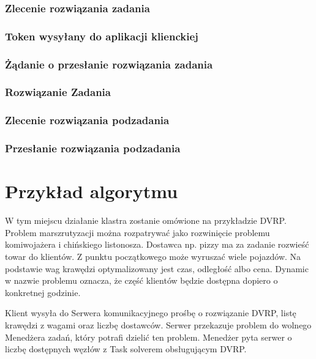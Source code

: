 \documentclass[12pt,a4paper,titlepage]{report}
\begin{document}
		\subsection{Zlecenie rozwiązania zadania}
			
		\subsection{Token wysyłany do aplikacji klienckiej}
			
		\subsection{Żądanie o przesłanie rozwiązania zadania}
			
		\subsection{Rozwiązanie Zadania}
			
		\subsection{Zlecenie rozwiązania podzadania}
			
		\subsection{Przesłanie rozwiązania podzadania}
			
			
\chapter{Przykład algorytmu}
		W tym miejscu działanie klastra zostanie omówione na przykładzie DVRP. Problem marszrutyzacji można rozpatrywać jako rozwinięcie problemu komiwojażera i chińskiego listonosza. Dostawca np. pizzy ma za zadanie rozwieść towar do klientów. Z punktu początkowego może wyruszać wiele pojazdów. Na podstawie wag krawędzi optymalizowany jest czas, odległość albo cena. Dynamic w nazwie problemu oznacza, że część klientów będzie dostępna dopiero o konkretnej godzinie.
		
		Klient wysyła do Serwera komunikacyjnego prośbę o rozwiązanie DVRP, listę krawędzi z wagami oraz liczbę dostawców. Serwer przekazuje problem do wolnego Menedżera zadań, który potrafi dzielić ten problem. Menedżer pyta serwer o liczbę dostępnych węzłów z Task solverem obsługującym DVRP.
		
\end{document}
